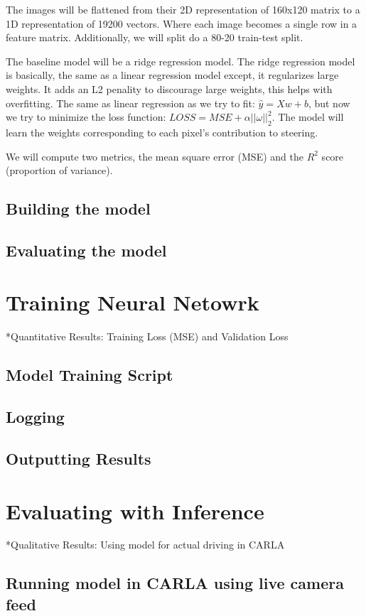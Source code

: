 \documentclass{article} %
\begin{document}
The images will be flattened from their 2D representation of 160x120 matrix to a 1D representation
of 19200 vectors. Where each image becomes a single row in a feature matrix. Additionally,
we will split do a 80-20 train-test split.

The baseline model will be a ridge regression model. The ridge regression model is basically, the
same as a linear regression model except, it regularizes large weights. It adds an L2 penality to
discourage large weights, this helps with overfitting. The same as linear regression as we try to
fit: $\hat{y} = Xw + b$, but now we try to minimize the loss function: $LOSS = MSE + \alpha 
||\omega||^2_2$. The model will learn the weights corresponding to each pixel's contribution to 
steering.

We will compute two metrics, the mean square error (MSE) and the $R^2$ score (proportion of variance). 





\subsection{Building the model}

\subsection{Evaluating the model}



\section{Training Neural Netowrk}

*Quantitative Results: Training Loss (MSE) and Validation Loss

\subsection{Model Training Script}

\subsection{Logging}

\subsection{Outputting Results}



\section{Evaluating with Inference}

*Qualitative Results: Using model for actual driving in CARLA

\subsection{Running model in CARLA using live camera feed}
\end{document}
